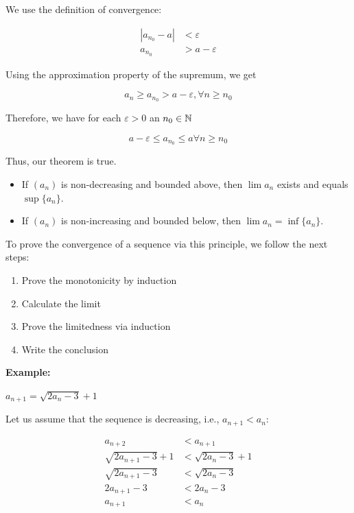 We use the definition of convergence:

\begin{align*}
	|a_{n_0} - a | & < \varepsilon     \\
	a_{n_0}        & > a - \varepsilon
\end{align*}

Using the approximation property of the supremum, we get

\[
	a_n \ge a_{n_0} > a - \varepsilon, \forall n \ge n_0
\]

Therefore, we have for each \(\varepsilon > 0\) an \(n_0 \in \mathbb{N}\)

\[
	a - \varepsilon \le a_{n_0} \le a  \forall n \ge n_0
\]

Thus, our theorem is true.

\QED

\begin{itemize}

	\item If \((a_n)\) is non-decreasing and bounded above, then \(\lim a_n\) exists and equals
	      \(\sup \{a_n\}\).

	\item If \((a_n)\) is non-increasing and bounded below, then \(\lim a_n = \inf \{a_n\}\).

\end{itemize}

To prove the convergence of a sequence via this principle, we follow the next steps:

\begin{enumerate}

	\item Prove the monotonicity by induction

	\item Calculate the limit

	\item Prove the limitedness via induction

	\item Write the conclusion

\end{enumerate}

\textbf{Example:}

\(a_{n + 1} = \sqrt{2a_n - 3} + 1\)

Let us assume that the sequence is decreasing, i.e., \(a_{n + 1} < a_{n}\):

\begin{align*}
	a_{n + 2}                & < a_{n + 1}             \\
	\sqrt{2a_{n + 1} -3} + 1 & < \sqrt{2a_{n} - 3} + 1 \\
	\sqrt{2a_{n + 1} -3}     & < \sqrt{2a_{n} - 3}     \\
	2a_{n + 1} - 3           & < 2a_{n} - 3            \\
	a_{n + 1}                & < a_{n}
\end{align*}

